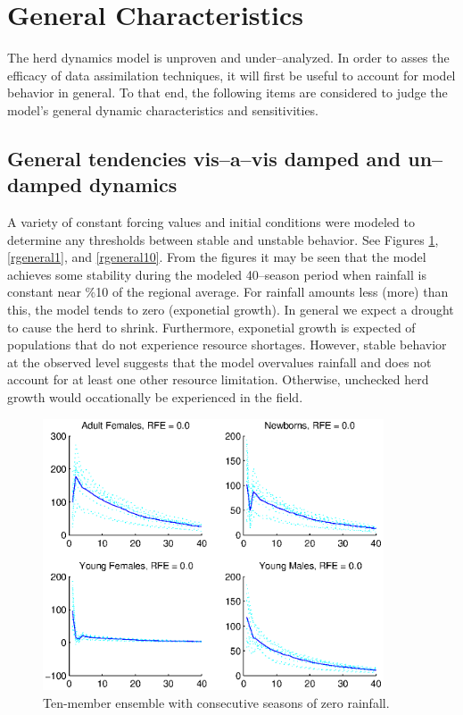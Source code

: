 \documentclass[fleqn, letterpaper]{article}
\numberwithin{figure}{section}
\begin{document}
\section{General Characteristics}
The herd dynamics model is unproven and under--analyzed. In order to asses the efficacy of data assimilation techniques, it will first be useful to account for model behavior in general. 
To that end, the following items are considered to judge the model's general dynamic characteristics and sensitivities. 

\subsection{General tendencies vis--a--vis damped and un--damped dynamics}
A variety of constant forcing values and initial conditions were modeled to determine any thresholds between stable and unstable behavior.
See Figures \ref{general0}, \ref{rgeneral1}, and \ref{rgeneral10}.
From the figures it may be seen that the model achieves some stability during the modeled 40--season period when rainfall is constant near \%10 of the regional average. For rainfall amounts less (more) than this, the model tends to zero (exponetial growth). In general we expect a drought to cause the herd to shrink. Furthermore, exponetial growth is expected of populations that do not experience resource shortages. However, stable behavior at the observed level suggests that the model overvalues rainfall and does not account for at least one other resource limitation. Otherwise, unchecked herd growth would occationally be experienced in the field. 
\begin{figure}
\includegraphics[width=0.9\textwidth]{general0}
\caption{Ten-member ensemble with consecutive seasons of zero rainfall.}
\label{general0}
\end{figure}
\end{document}
